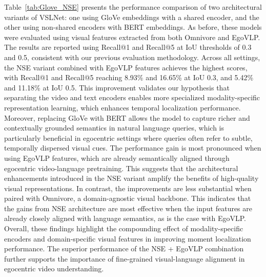 \documentclass[10pt,twocolumn,letterpaper]{article}
\begin{document}
Table~\ref{tab:Glove_NSE} presents the performance comparison of two architectural variants of VSLNet: one using GloVe embeddings with a shared encoder, and the other using non-shared encoders with BERT embeddings. As before, these models were evaluated using visual features extracted from both Omnivore and EgoVLP. The results are reported using Recall@1 and Recall@5 at IoU thresholds of 0.3 and 0.5, consistent with our previous evaluation methodology.
Across all settings, the NSE variant combined with EgoVLP features achieves the highest scores, with Recall@1 and Recall@5 reaching 8.93\% and 16.65\% at IoU 0.3, and 5.42\% and 11.18\% at IoU 0.5. This improvement validates our hypothesis that separating the video and text encoders enables more specialized modality-specific representation learning, which enhances temporal localization performance. Moreover, replacing GloVe with BERT allows the model to capture richer and contextually grounded semantics in natural language queries, which is particularly beneficial in egocentric settings where queries often refer to subtle, temporally dispersed visual cues.
The performance gain is most pronounced when using EgoVLP features, which are already semantically aligned through egocentric video-language pretraining. This suggests that the architectural enhancements introduced in the NSE variant amplify the benefits of high-quality visual representations. In contrast, the improvements are less substantial when paired with Omnivore, a domain-agnostic visual backbone. This indicates that the gains from NSE architecture are most effective when the input features are already closely aligned with language semantics, as is the case with EgoVLP.
Overall, these findings highlight the compounding effect of modality-specific encoders and domain-specific visual features in improving moment localization performance. The superior performance of the NSE + EgoVLP combination further supports the importance of fine-grained visual-language alignment in egocentric video understanding.
	
\end{document}
